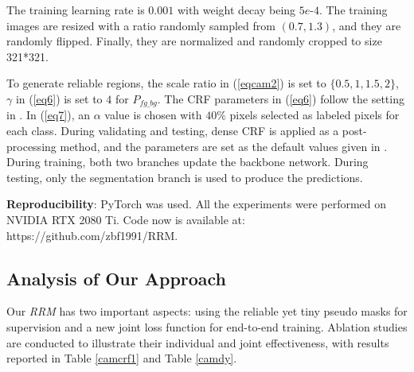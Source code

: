 \documentclass[letterpaper]{article} \usepackage{aaai20}  \usepackage{times}  \usepackage{helvet} \usepackage{courier}  \usepackage[hyphens]{url}  \usepackage{graphicx} \urlstyle{rm} \def\UrlFont{\rm}  \usepackage{graphicx}  \frenchspacing  \setlength{\pdfpagewidth}{8.5in}  \setlength{\pdfpageheight}{11in}
\begin{document}
The training learning rate is $0.001$ with weight decay being $5e$-$4$. The training images are resized with a ratio randomly sampled from $(0.7, 1.3)$, and they are randomly flipped. Finally, they are normalized and randomly cropped to size 321*321.

To generate reliable regions, the scale ratio in (\ref{eqcam2}) is set to $\{0.5, 1, 1.5, 2\}$, $\gamma$ in (\ref{eq6}) is set to $4$ for $P_{fg\_bg}$. The CRF parameters in (\ref{eq6}) follow the setting in \cite{ahn2018learning}. In (\ref{eq7}), an $\alpha$ value is chosen with $40\%$ pixels selected as labeled pixels for each class.  During validating and testing, dense CRF is applied as a post-processing method, and the parameters are set as the default values given in \cite{huang2018weakly}.
During training, both two branches update the backbone network. During testing, only the segmentation branch is used to produce the predictions.

\noindent\textbf{Reproducibility}: PyTorch \cite{paszke2017automatic} was used. All the experiments were performed on NVIDIA RTX 2080 Ti. Code now is available at: https://github.com/zbf1991/RRM.

\subsection{Analysis of Our Approach}


Our \emph{RRM} has two important aspects: using the reliable yet tiny pseudo masks for supervision and a new joint loss function for end-to-end training. Ablation studies are conducted to illustrate their individual and joint effectiveness, with results reported in Table \ref{camcrf1} and Table \ref{camdy}.

\begin{table}[!htb]
	\centering
	\caption{Performance on PASCAL VOC 2012 \emph{val} set based on different mined region. Ratio means the proportion of reliable regions which is mined by our method to the whole pixels. "CE loss" means only cross entropy loss was used for our segmentation branch and "Joint loss" means our dense energy loss was combined with cross entropy loss was used for the segmentation branch. }\label{camcrf1}

\end{table}
\end{document}
